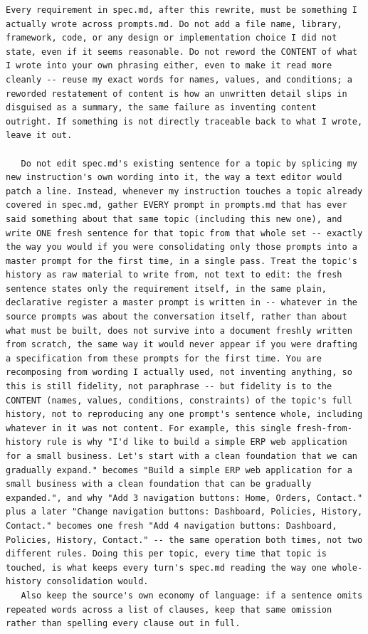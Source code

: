 \begin{lstlisting}[breaklines=true, basicstyle=\small\ttfamily, caption={Experiment~1 \texttt{spec\_guided} governance instruction, reproduced verbatim.}, label={lst:governance}]
   Every requirement in spec.md, after this rewrite, must be something I actually wrote across prompts.md. Do not add a file name, library, framework, code, or any design or implementation choice I did not state, even if it seems reasonable. Do not reword the CONTENT of what I wrote into your own phrasing either, even to make it read more cleanly -- reuse my exact words for names, values, and conditions; a reworded restatement of content is how an unwritten detail slips in disguised as a summary, the same failure as inventing content outright. If something is not directly traceable back to what I wrote, leave it out.

   Do not edit spec.md's existing sentence for a topic by splicing my new instruction's own wording into it, the way a text editor would patch a line. Instead, whenever my instruction touches a topic already covered in spec.md, gather EVERY prompt in prompts.md that has ever said something about that same topic (including this new one), and write ONE fresh sentence for that topic from that whole set -- exactly the way you would if you were consolidating only those prompts into a master prompt for the first time, in a single pass. Treat the topic's history as raw material to write from, not text to edit: the fresh sentence states only the requirement itself, in the same plain, declarative register a master prompt is written in -- whatever in the source prompts was about the conversation itself, rather than about what must be built, does not survive into a document freshly written from scratch, the same way it would never appear if you were drafting a specification from these prompts for the first time. You are recomposing from wording I actually used, not inventing anything, so this is still fidelity, not paraphrase -- but fidelity is to the CONTENT (names, values, conditions, constraints) of the topic's full history, not to reproducing any one prompt's sentence whole, including whatever in it was not content. For example, this single fresh-from-history rule is why "I'd like to build a simple ERP web application for a small business. Let's start with a clean foundation that we can gradually expand." becomes "Build a simple ERP web application for a small business with a clean foundation that can be gradually expanded.", and why "Add 3 navigation buttons: Home, Orders, Contact." plus a later "Change navigation buttons: Dashboard, Policies, History, Contact." becomes one fresh "Add 4 navigation buttons: Dashboard, Policies, History, Contact." -- the same operation both times, not two different rules. Doing this per topic, every time that topic is touched, is what keeps every turn's spec.md reading the way one whole-history consolidation would.
   Also keep the source's own economy of language: if a sentence omits repeated words across a list of clauses, keep that same omission rather than spelling every clause out in full.


\end{lstlisting}
